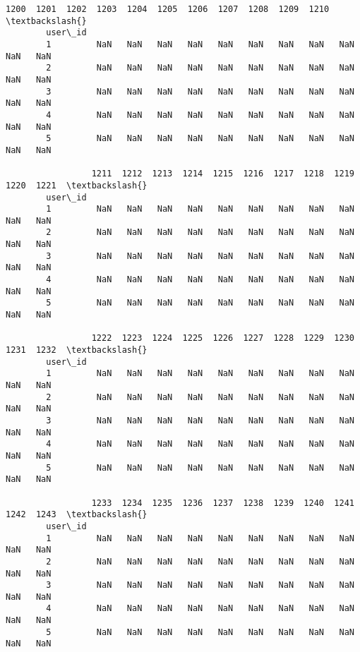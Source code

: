 \documentclass[11pt]{article}
\begin{document}
\begin{Verbatim}[commandchars=\\\{\}]
                 1200  1201  1202  1203  1204  1205  1206  1207  1208  1209  1210  \textbackslash{}
        user\_id                                                                     
        1         NaN   NaN   NaN   NaN   NaN   NaN   NaN   NaN   NaN   NaN   NaN   
        2         NaN   NaN   NaN   NaN   NaN   NaN   NaN   NaN   NaN   NaN   NaN   
        3         NaN   NaN   NaN   NaN   NaN   NaN   NaN   NaN   NaN   NaN   NaN   
        4         NaN   NaN   NaN   NaN   NaN   NaN   NaN   NaN   NaN   NaN   NaN   
        5         NaN   NaN   NaN   NaN   NaN   NaN   NaN   NaN   NaN   NaN   NaN   
        
                 1211  1212  1213  1214  1215  1216  1217  1218  1219  1220  1221  \textbackslash{}
        user\_id                                                                     
        1         NaN   NaN   NaN   NaN   NaN   NaN   NaN   NaN   NaN   NaN   NaN   
        2         NaN   NaN   NaN   NaN   NaN   NaN   NaN   NaN   NaN   NaN   NaN   
        3         NaN   NaN   NaN   NaN   NaN   NaN   NaN   NaN   NaN   NaN   NaN   
        4         NaN   NaN   NaN   NaN   NaN   NaN   NaN   NaN   NaN   NaN   NaN   
        5         NaN   NaN   NaN   NaN   NaN   NaN   NaN   NaN   NaN   NaN   NaN   
        
                 1222  1223  1224  1225  1226  1227  1228  1229  1230  1231  1232  \textbackslash{}
        user\_id                                                                     
        1         NaN   NaN   NaN   NaN   NaN   NaN   NaN   NaN   NaN   NaN   NaN   
        2         NaN   NaN   NaN   NaN   NaN   NaN   NaN   NaN   NaN   NaN   NaN   
        3         NaN   NaN   NaN   NaN   NaN   NaN   NaN   NaN   NaN   NaN   NaN   
        4         NaN   NaN   NaN   NaN   NaN   NaN   NaN   NaN   NaN   NaN   NaN   
        5         NaN   NaN   NaN   NaN   NaN   NaN   NaN   NaN   NaN   NaN   NaN   
        
                 1233  1234  1235  1236  1237  1238  1239  1240  1241  1242  1243  \textbackslash{}
        user\_id                                                                     
        1         NaN   NaN   NaN   NaN   NaN   NaN   NaN   NaN   NaN   NaN   NaN   
        2         NaN   NaN   NaN   NaN   NaN   NaN   NaN   NaN   NaN   NaN   NaN   
        3         NaN   NaN   NaN   NaN   NaN   NaN   NaN   NaN   NaN   NaN   NaN   
        4         NaN   NaN   NaN   NaN   NaN   NaN   NaN   NaN   NaN   NaN   NaN   
        5         NaN   NaN   NaN   NaN   NaN   NaN   NaN   NaN   NaN   NaN   NaN   
        

\end{Verbatim}
\end{document}
